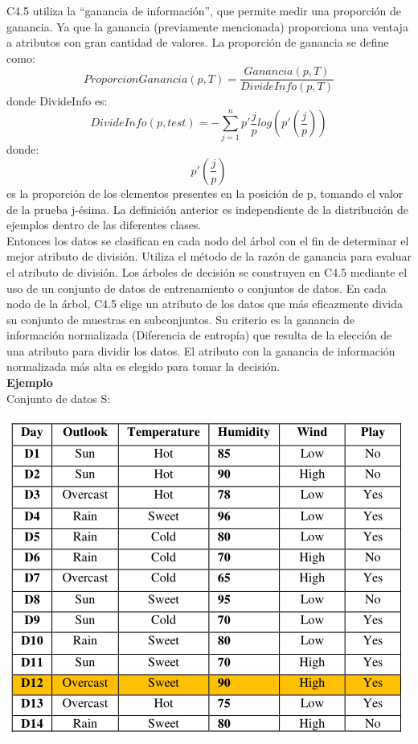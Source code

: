 \documentclass{article}
\begin{document}
C4.5 utiliza la “ganancia de información”, que permite medir una proporción de ganancia. Ya que la ganancia (previamente mencionada) proporciona una ventaja a atributos con gran cantidad de valores.
 La proporción de ganancia se define como:\\
 $$ ProporcionGanancia(p,T) = \frac{Ganancia(p,T)}{DivideInfo(p,T)} $$
 donde DivideInfo es:\\
 \begin{equation*}
 DivideInfo(p,test) = - \sum_{j=1}^{n}p'\frac{j}{p}log(p'(\frac{j}{p}))
 \end{equation*}
donde: $$ p'(\frac{j}{p})$$
es la proporción de los elementos presentes en la posición de p, tomando el valor de la prueba j-ésima. La definición anterior es independiente de la distribución de ejemplos dentro de las diferentes clases.\\
Entonces los datos se clasifican en cada nodo del árbol con el fin de determinar el mejor atributo de división. Utiliza el método de la razón de ganancia para evaluar el atributo de división.
Los árboles de decisión se construyen en C4.5 mediante el uso de un conjunto de datos de entrenamiento o conjuntos de datos. En cada nodo de la árbol, C4.5 elige un atributo de los datos que más eficazmente divida su conjunto de muestras en subconjuntos.  Su criterio es la ganancia de información normalizada (Diferencia de entropía) que resulta de la elección de una atributo para dividir los datos. El atributo con la ganancia de información normalizada más alta es elegido para tomar la decisión.\\

 {\bf Ejemplo}\\
 Conjunto de datos S:
\begin{center}
 \includegraphics[scale=0.65]{conjunto}\\
\end{center}
\end{document}
